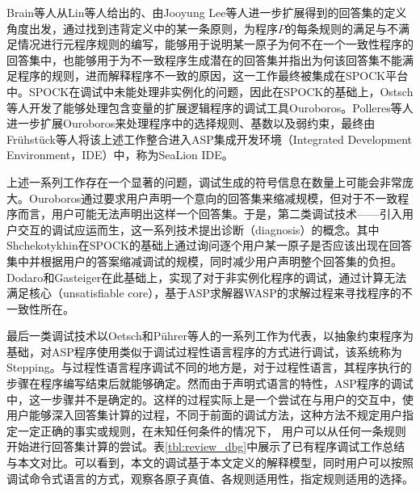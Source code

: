 Brain等人从Lin等人给出的\cite{lin2004assat}、由Jooyung Lee等人进一步扩展\cite{lee2005modeltheoretic}得到的回答集的定义角度出发，通过找到违背定义中的某一条原则，为程序$P$的每条规则的满足与不满足情况进行元程序规则的编写，能够用于说明某一原子为何不在一个一致性程序的回答集中，也能够用于为不一致程序生成潜在的回答集并指出为何该回答集不能满足程序的规则，进而解释程序不一致的原因，这一工作最终被集成在\textsf{SPOCK}平台中\cite{brain2007that,brain2007debugging}。\textsf{SPOCK}在调试中未能处理非实例化的问题，因此在\textsf{SPOCK}的基础上，Ostsch等人开发了能够处理包含变量的扩展逻辑程序的调试工具\textsf{Ouroboros}\cite{oetsch2010catching}。Polleres等人进一步扩展\textsf{Ouroboros}\cite{polleres2013debugging}来处理程序中的选择规则、基数以及弱约束\cite{calimeri2020aspcore2}，最终由Fr\"uhst\"uck等人将该上述工作整合进入ASP集成开发环境（Integrated Development Environment，IDE）中，称为SeaLion IDE\cite{fruhstuck2013debugging}。

上述一系列工作存在一个显著的问题，调试生成的符号信息在数量上可能会非常庞大。\textsf{Ouroboros}通过要求用户声明一个意向的回答集来缩减规模，但对于不一致程序而言，用户可能无法声明出这样一个回答集。于是，第二类调试技术——引入用户交互的调试应运而生，这一系列技术提出诊断（diagnosis）的概念。其中Shchekotykhin在\textsf{SPOCK}的基础上通过询问逐个用户某一原子是否应该出现在回答集中并根据用户的答案缩减调试的规模，同时减少用户声明整个回答集的负担\cite{shchekotykhin2015interactive}。Dodaro\cite{dodaro2015interactive}和Gasteiger\cite{gasteiger2016integrated}在此基础上，实现了对于非实例化程序的调试，通过计算无法满足核心（unsatisfiable core），基于ASP求解器WASP\cite{alviano2013wasp,alviano2015advances}的求解过程来寻找程序的不一致性所在。

最后一类调试技术以Oetsch和P\"uhrer等人的一系列工作为代表\cite{oetsch2011stepping,oetsch2018stepwise,puhrer2014stepwise}，以抽象约束程序为基础，对ASP程序使用类似于调试过程性语言程序的方式进行调试，该系统称为\textsf{Stepping}。与过程性语言程序调试不同的地方是，对于过程性语言，其程序执行的步骤在程序编写结束后就能够确定。然而由于声明式语言的特性，ASP程序的调试中，这一步骤并不是确定的。这样的过程实际上是一个尝试在与用户的交互中，使用户能够深入回答集计算的过程，不同于前面的调试方法，这种方法不规定用户指定一定正确的事实或规则，在未知任何条件的情况下， 用户可以从任何一条规则开始进行回答集计算的尝试。表\ref{tbl:review_dbg}中展示了已有程序调试工作总结与本文对比。可以看到，本文的调试基于本文定义的解释模型，同时用户可以按照调试命令式语言的方式，观察各原子真值、各规则适用性，指定规则适用的选择。


